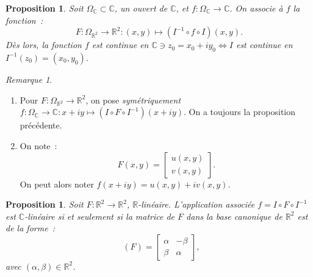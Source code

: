 \documentclass{report}
\newtheorem{prp}[thm]{Proposition}
\theoremstyle{definition}
\theoremstyle{remark}
\newtheorem*{rmq}{Remarque}
\numberwithin{equation}{section}
\newcommand{\C}{\mathbb C}
\newcommand{\R}{\mathbb R}
\DeclareMathOperator{\Mat}{Mat}
\DeclareMathOperator{\MatBC}{\Mat_{B_C}}
\begin{document}
			\begin{prp} Soit $\Omega_\C \subset \C$, un ouvert de $\C$, et $f : \Omega_\C \to \C$. On associe à $f$ la fonction~:
			\begin{equation}
				F : \Omega_{\R^2} \to \R^2 : (x, y) \mapsto (I^{-1} \circ f \circ I)(x, y).
			\end{equation}
			Dès lors, la fonction $f$ est continue en $\C \ni z_0 = x_0 + iy_0 \iff I$ est continue en $I^{-1}(z_0) = (x_0, y_0)$.
			\end{prp}

			\begin{rmq}~
				\begin{enumerate}
					\item Pour $F : \Omega_{\R^2} \to \R^2$, on pose \textit{symétriquement} $f : \Omega_\C \to \C : x+iy \mapsto (I \circ F \circ I^{-1})(x+iy)$. On
					a toujours la proposition précédente.
					\item On note~:
					\begin{equation}
						F(x, y) = \begin{bmatrix}u(x, y) \\v(x, y)\end{bmatrix}.
					\end{equation}
					On peut alors noter $f(x+iy) = u(x, y) + iv(x, y)$.
				\end{enumerate}
			\end{rmq}

			\begin{prp} Soit $F : \R^2 \to \R^2$, $\R$-linéaire. L'application associée $f = I \circ F \circ I^{-1}$ est $\C$-linéaire si et seulement si la matrice
			de $F$ dans la base canonique de $\R^2$ est de la forme~:
			\begin{equation}\label{eq:C-linéaire -> matrice rotation}
				\MatBC(F) = \begin{bmatrix}\alpha & -\beta \\\beta & \alpha\end{bmatrix},
			\end{equation}
			avec $(\alpha, \beta) \in \R^2$.
			\end{prp}
\end{document}
